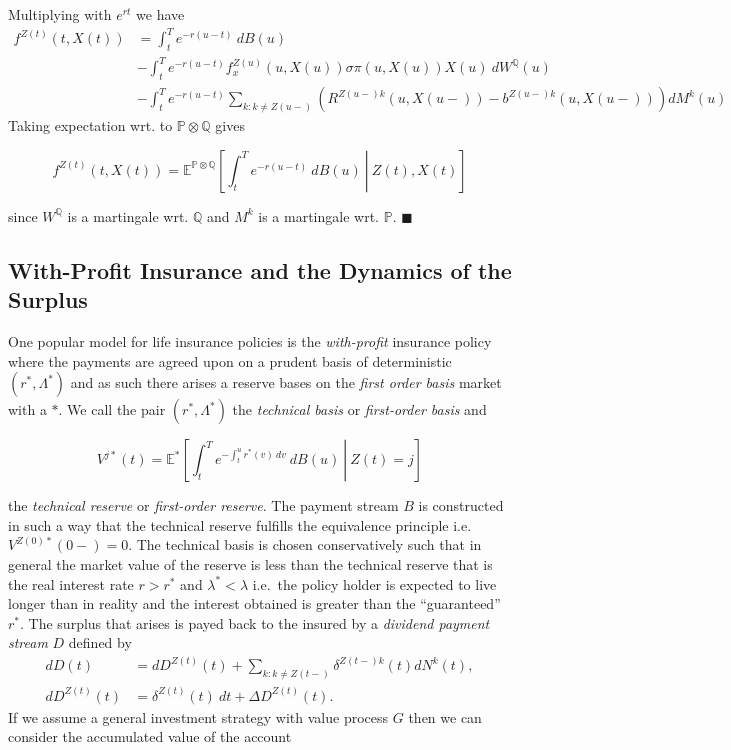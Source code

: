 \documentclass[a4paper,10pt,openany]{book}
\begin{document}
Multiplying with \(e^{rt}\) we have
\begin{align*}
f^{Z(t)}(t,X(t))&=\int_t^Te^{-r(u-t)}\ dB(u)\\
&-\int_t^Te^{-r(u-t)}f_x^{Z(u)}(u,X(u))\sigma \pi(u,X(u))X(u)\ dW^\mathbb Q(u)\\
&-\int_t^Te^{-r(u-t)}\sum_{k:k\ne Z(u-)}\left(R^{Z(u-)k}(u,X(u-))-b^{Z(u-)k}(u,X(u-))\right)dM^k(u)
\end{align*}
Taking expectation wrt. to \(\mathbb P\otimes \mathbb Q\) gives

\[
f^{Z(t)}(t,X(t))=\mathbb E^{\mathbb P \otimes \mathbb Q}\left[\left.\int_t^Te^{-r(u-t)}\ dB(u)\ \right\vert\ Z(t),X(t) \right]
\]

since \(W^\mathbb Q\) is a martingale wrt. \(\mathbb Q\) and \(M^k\) is a martingale wrt. \(\mathbb P\). \(\blacksquare\)

\hypertarget{with-profit-insurance-and-the-dynamics-of-the-surplus}{%
\subsection{With-Profit Insurance and the Dynamics of the Surplus}\label{with-profit-insurance-and-the-dynamics-of-the-surplus}}

One popular model for life insurance policies is the \emph{with-profit} insurance policy where the payments are agreed upon on a prudent basis of deterministic \((r^*,\Lambda ^*)\) and as such there arises a reserve bases on the \emph{first order basis} market with a \(*\). We call the pair \((r^*,\Lambda ^*)\) the \emph{technical basis} or \emph{first-order basis} and

\[
V^{j*}(t)=\mathbb E^*\left[\left.\int_t^Te^{-\int_t^u r^*(v)\ dv}\ dB(u)\ \right\vert\ Z(t)=j\right]
\]

the \emph{technical reserve} or \emph{first-order reserve}. The payment stream \(B\) is constructed in such a way that the technical reserve fulfills the equivalence principle i.e.~\(V^{Z(0)*}(0-)=0\). The technical basis is chosen conservatively such that in general the market value of the reserve is less than the technical reserve that is the real interest rate \(r>r^*\) and \(\lambda^*<\lambda\) i.e.~the policy holder is expected to live longer than in reality and the interest obtained is greater than the ``guaranteed'' \(r^*\). The surplus that arises is payed back to the insured by a \emph{dividend payment stream} \(D\) defined by
\begin{align*}
dD(t)&=dD^{Z(t)}(t)+\sum_{k:k\ne Z(t-)}\delta^{Z(t-)k}(t)dN^k(t),\\
dD^{Z(t)}(t)&=\delta^{Z(t)}(t)\ dt+\Delta D^{Z(t)}(t).
\end{align*}
If we assume a general investment strategy with value process \(G\) then we can consider the accumulated value of the account
\end{document}
